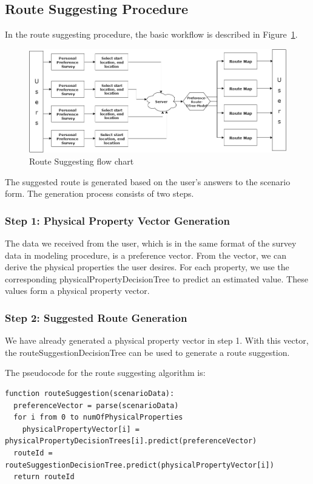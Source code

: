 \documentclass{sigchi}
\begin{document}
\subsection{Route Suggesting Procedure}
In the route suggesting procedure, the basic workflow is described in Figure~\ref{fig:route-suggest-work-flow}.

\begin{figure}[!h]
\centering
\includegraphics[width=1.0\columnwidth]{pics/route-suggest-work-flow.png}
\caption{Route Suggesting flow chart}
\label{fig:route-suggest-work-flow}
\end{figure}

The suggested route is generated based on the user’s answers to the scenario form. The generation process consists of two steps.

\subsubsection{Step 1: Physical Property Vector Generation}
The data we received from the user, which is in the same format of the survey data in modeling procedure,  is a preference vector. From the vector, we can derive the physical properties the user desires. For each property, we use the corresponding physicalPropertyDecisionTree to predict an estimated value. These values form a physical property vector.

\subsubsection{Step 2: Suggested Route Generation}
We have already generated a physical property vector in step 1. With this vector, the routeSuggestionDecisionTree can be used to generate a route suggestion.

The pseudocode for the route suggesting algorithm is:
\begin{verbatim}
function routeSuggestion(scenarioData):
  preferenceVector = parse(scenarioData)
  for i from 0 to numOfPhysicalProperties
    physicalPropertyVector[i] = physicalPropertyDecisionTrees[i].predict(preferenceVector)
  routeId = routeSuggestionDecisionTree.predict(physicalPropertyVector[i])
  return routeId
\end{verbatim}
\end{document}

